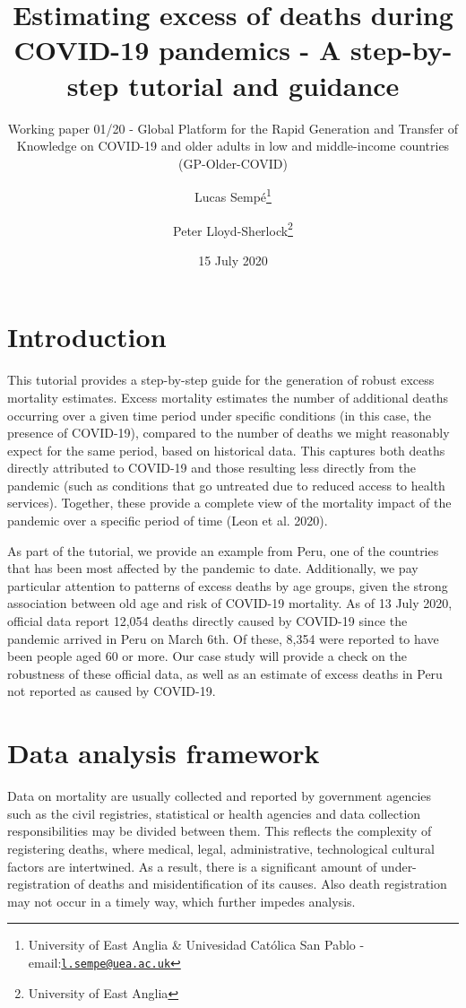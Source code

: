 \documentclass[
]{article}
\title{Estimating excess of deaths during COVID-19 pandemics - A step-by-step tutorial and guidance}
\subtitle{Working paper 01/20 - Global Platform for the Rapid Generation and Transfer of Knowledge\textbar{} on COVID-19 and older adults in low and middle-income countries (GP-Older-COVID)}
\author{Lucas Sempé\footnote{University of East Anglia \& Univesidad Católica San Pablo - email:\href{mailto:l.sempe@uea.ac.uk}{\nolinkurl{l.sempe@uea.ac.uk}}} \and Peter Lloyd-Sherlock\footnote{University of East Anglia}}
\date{15 July 2020}
\begin{document}
\maketitle

\hypertarget{introduction}{%
\section{Introduction}\label{introduction}}

This tutorial provides a step-by-step guide for the generation of robust excess mortality estimates. Excess mortality estimates the number of additional deaths occurring over a given time period under specific conditions (in this case, the presence of COVID-19), compared to the number of deaths we might reasonably expect for the same period, based on historical data. This captures both deaths directly attributed to COVID-19 and those resulting less directly from the pandemic (such as conditions that go untreated due to reduced access to health services). Together, these provide a complete view of the mortality impact of the pandemic over a specific period of time (Leon et al. 2020).

As part of the tutorial, we provide an example from Peru, one of the countries that has been most affected by the pandemic to date. Additionally, we pay particular attention to patterns of excess deaths by age groups, given the strong association between old age and risk of COVID-19 mortality. As of 13 July 2020, official data report 12,054 deaths directly caused by COVID-19 since the pandemic arrived in Peru on March 6th. Of these, 8,354 were reported to have been people aged 60 or more. Our case study will provide a check on the robustness of these official data, as well as an estimate of excess deaths in Peru not reported as caused by COVID-19.

\hypertarget{data}{%
\section{Data analysis framework}\label{data}}

Data on mortality are usually collected and reported by government agencies such as the civil registries, statistical or health agencies and data collection responsibilities may be divided between them. This reflects the complexity of registering deaths, where medical, legal, administrative, technological cultural factors are intertwined. As a result, there is a significant amount of under-registration of deaths and misidentification of its causes. Also death registration may not occur in a timely way, which further impedes analysis.
\end{document}
